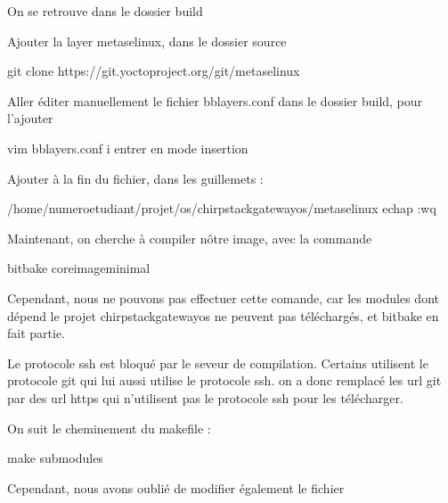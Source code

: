 \documentclass[letterpaper,10pt,french]{sphinxmanual}
\begin{document}
On se retrouve dans le dossier build

Ajouter la layer meta\sphinxhyphen{}selinux, dans le dossier source

\begin{sphinxVerbatim}[commandchars=\\\{\}]
git clone https://git.yoctoproject.org/git/meta\PYGZhy{}selinux
\end{sphinxVerbatim}

Aller éditer manuellement le fichier bblayers.conf dans le dossier build, pour l’ajouter

\begin{sphinxVerbatim}[commandchars=\\\{\}]
vim bblayers.conf
i entrer en mode insertion
\end{sphinxVerbatim}

Ajouter à la fin du fichier, dans les guillemets :

\begin{sphinxVerbatim}[commandchars=\\\{\}]
/home/numeroetudiant/projet/os/chirpstack\PYGZhy{}gateway\PYGZhy{}os/meta\PYGZhy{}selinux 
echap
:wq
\end{sphinxVerbatim}

Maintenant, on cherche à compiler nôtre image, avec la commande

\begin{sphinxVerbatim}[commandchars=\\\{\}]
bitbake core\PYGZhy{}image\PYGZhy{}minimal
\end{sphinxVerbatim}

Cependant, nous ne pouvons pas effectuer cette comande, car les modules dont dépend le projet chirpstack\sphinxhyphen{}gateway\sphinxhyphen{}os ne peuvent pas téléchargés, et bitbake en fait partie.

Le protocole ssh est bloqué par le seveur de compilation. Certains utilisent le protocole git qui lui aussi utilise le protocole ssh.
on a donc remplacé les url git par des url https qui n’utilisent pas le protocole ssh pour les télécharger.

On suit le cheminement du makefile :

\begin{sphinxVerbatim}[commandchars=\\\{\}]
make submodules
\end{sphinxVerbatim}

Cependant, nous avons oublié de modifier également le fichier
\end{document}
